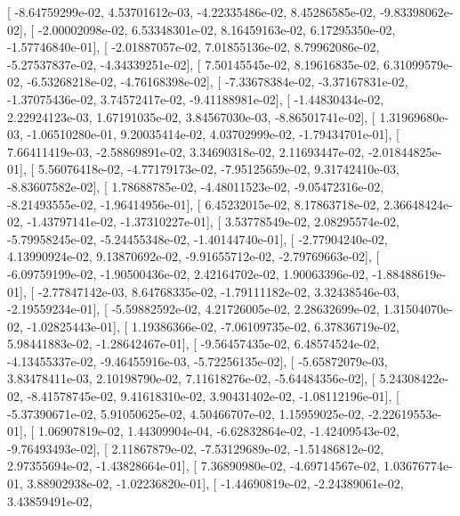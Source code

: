\documentclass{article}
\begin{document}
       [ -8.64759299e-02,   4.53701612e-03,  -4.22335486e-02,
          8.45286585e-02,  -9.83398062e-02],
       [ -2.00002098e-02,   6.53348301e-02,   8.16459163e-02,
          6.17295350e-02,  -1.57746840e-01],
       [ -2.01887057e-02,   7.01855136e-02,   8.79962086e-02,
         -5.27537837e-02,  -4.34339251e-02],
       [  7.50145545e-02,   8.19616835e-02,   6.31099579e-02,
         -6.53268218e-02,  -4.76168398e-02],
       [ -7.33678384e-02,  -3.37167831e-02,  -1.37075436e-02,
          3.74572417e-02,  -9.41188981e-02],
       [ -1.44830434e-02,   2.22924123e-03,   1.67191035e-02,
          3.84567030e-03,  -8.86501741e-02],
       [  1.31969680e-03,  -1.06510280e-01,   9.20035414e-02,
          4.03702999e-02,  -1.79434701e-01],
       [  7.66411419e-03,  -2.58869891e-02,   3.34690318e-02,
          2.11693447e-02,  -2.01844825e-01],
       [  5.56076418e-02,  -4.77179173e-02,  -7.95125659e-02,
          9.31742410e-03,  -8.83607582e-02],
       [  1.78688785e-02,  -4.48011523e-02,  -9.05472316e-02,
         -8.21493555e-02,  -1.96414956e-01],
       [  6.45232015e-02,   8.17863718e-02,   2.36648424e-02,
         -1.43797141e-02,  -1.37310227e-01],
       [  3.53778549e-02,   2.08295574e-02,  -5.79958245e-02,
         -5.24455348e-02,  -1.40144740e-01],
       [ -2.77904240e-02,   4.13990924e-02,   9.13870692e-02,
         -9.91655712e-02,  -2.79769663e-02],
       [ -6.09759199e-02,  -1.90500436e-02,   2.42164702e-02,
          1.90063396e-02,  -1.88488619e-01],
       [ -2.77847142e-03,   8.64768335e-02,  -1.79111182e-02,
          3.32438546e-03,  -2.19559234e-01],
       [ -5.59882592e-02,   4.21726005e-02,   2.28632699e-02,
          1.31504070e-02,  -1.02825443e-01],
       [  1.19386366e-02,  -7.06109735e-02,   6.37836719e-02,
          5.98441883e-02,  -1.28642467e-01],
       [ -9.56457435e-02,   6.48574524e-02,  -4.13455337e-02,
         -9.46455916e-03,  -5.72256135e-02],
       [ -5.65872079e-03,   3.83478411e-03,   2.10198790e-02,
          7.11618276e-02,  -5.64484356e-02],
       [  5.24308422e-02,  -8.41578745e-02,   9.41618310e-02,
          3.90431402e-02,  -1.08112196e-01],
       [ -5.37390671e-02,   5.91050625e-02,   4.50466707e-02,
          1.15959025e-02,  -2.22619553e-01],
       [  1.06907819e-02,   1.44309904e-04,  -6.62832864e-02,
         -1.42409543e-02,  -9.76493493e-02],
       [  2.11867879e-02,  -7.53129689e-02,  -1.51486812e-02,
          2.97355694e-02,  -1.43828664e-01],
       [  7.36890980e-02,  -4.69714567e-02,   1.03676774e-01,
          3.88902938e-02,  -1.02236820e-01],
       [ -1.44690819e-02,  -2.24389061e-02,   3.43859491e-02,
\end{document}
